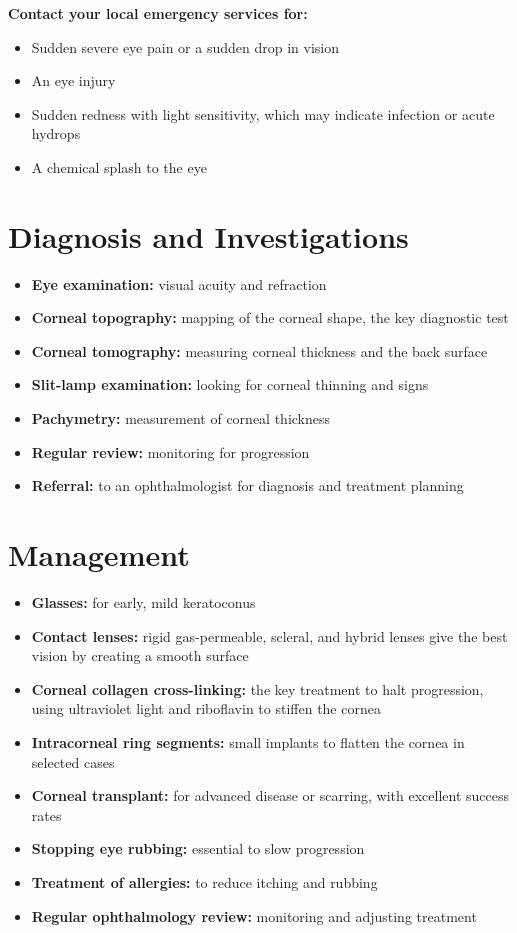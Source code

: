 \textbf{Contact your local emergency services for:}
\begin{itemize}
    \item Sudden severe eye pain or a sudden drop in vision
    \item An eye injury
    \item Sudden redness with light sensitivity, which may indicate infection or acute hydrops
    \item A chemical splash to the eye
\end{itemize}

\section*{Diagnosis and Investigations}
\begin{itemize}
    \item \textbf{Eye examination:} visual acuity and refraction
    \item \textbf{Corneal topography:} mapping of the corneal shape, the key diagnostic test
    \item \textbf{Corneal tomography:} measuring corneal thickness and the back surface
    \item \textbf{Slit-lamp examination:} looking for corneal thinning and signs
    \item \textbf{Pachymetry:} measurement of corneal thickness
    \item \textbf{Regular review:} monitoring for progression
    \item \textbf{Referral:} to an ophthalmologist for diagnosis and treatment planning
\end{itemize}

\section*{Management}
\begin{itemize}
    \item \textbf{Glasses:} for early, mild keratoconus
    \item \textbf{Contact lenses:} rigid gas-permeable, scleral, and hybrid lenses give the best vision by creating a smooth surface
    \item \textbf{Corneal collagen cross-linking:} the key treatment to halt progression, using ultraviolet light and riboflavin to stiffen the cornea
    \item \textbf{Intracorneal ring segments:} small implants to flatten the cornea in selected cases
    \item \textbf{Corneal transplant:} for advanced disease or scarring, with excellent success rates
    \item \textbf{Stopping eye rubbing:} essential to slow progression
    \item \textbf{Treatment of allergies:} to reduce itching and rubbing
    \item \textbf{Regular ophthalmology review:} monitoring and adjusting treatment
\end{itemize}

